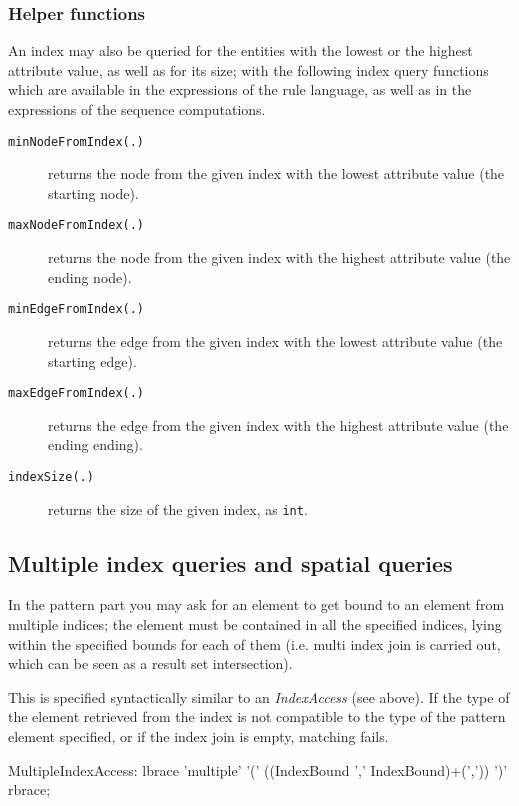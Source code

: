 \subsubsection*{Helper functions}

An index may also be queried for the entities with the lowest or the highest attribute value, as well as for its size;
with the following index query functions which are available in the expressions of the rule language, as well as in the expressions of the sequence computations.

\begin{description}
\item[\texttt{minNodeFromIndex(.)}] returns the node from the given index with the lowest attribute value (the starting node).
\item[\texttt{maxNodeFromIndex(.)}] returns the node from the given index with the highest attribute value (the ending node).
\item[\texttt{minEdgeFromIndex(.)}] returns the edge from the given index with the lowest attribute value (the starting edge).
\item[\texttt{maxEdgeFromIndex(.)}] returns the edge from the given index with the highest attribute value (the ending ending).
\item[\texttt{indexSize(.)}] returns the size of the given index, as \texttt{int}.
\end{description}


\subsection*{Multiple index queries and spatial queries}\label{sub:indexusage}

In the pattern part you may ask for an element to get bound to an element from multiple indices;
the element must be contained in all the specified indices, lying within the specified bounds for each of them (i.e. multi index join is carried out, which can be seen as a result set intersection).

This is specified syntactically similar to an \emph{IndexAccess} (see above).
If the type of the element retrieved from the index is not compatible to the type of the pattern element specified,
or if the index join is empty, matching fails.

\begin{rail}
  MultipleIndexAccess:
    lbrace 'multiple' '(' ((IndexBound ',' IndexBound)+(',')) ')' rbrace;
\end{rail}

